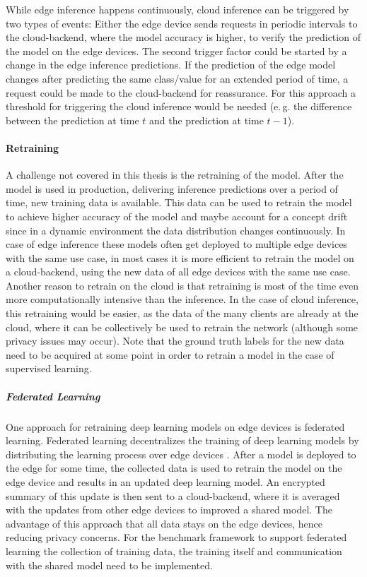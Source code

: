 While edge inference happens continuously, cloud inference can be triggered by two types of events:
Either the edge device sends requests in periodic intervals to the cloud-backend, where the model accuracy is higher, to verify the prediction of the model on the edge devices.
The second trigger factor could be started by a change in the edge inference predictions. If the prediction of the edge model changes after predicting the same class/value for an extended period of time, a request could be made to the cloud-backend for reassurance. For this approach a threshold for triggering the cloud inference would be needed (e.\,g. the difference between the prediction at time $t$ and the prediction at time $t-1$).



\paragraph{Retraining}
A challenge not covered in this thesis is the retraining of the model. After the model is used in production, delivering inference predictions over a period of time, new training data is available. This data can be used to retrain the model to achieve higher accuracy of the model and maybe account for a concept drift since in a dynamic environment the data distribution changes continuously.
In case of edge inference these models often get deployed to multiple edge devices with the same use case, in most cases it is more efficient to retrain the model on a cloud-backend, using the new data of all edge devices with the same use case. Another reason to retrain on the cloud is that retraining is most of the time even more computationally intensive than the inference.
In the case of cloud inference, this retraining would be easier, as the data of the many clients are already at the cloud, where it can be collectively be used to retrain the network (although some privacy issues may occur).
Note that the ground truth labels for the new data need to be acquired at some point in order to retrain a model in the case of supervised learning.

\subparagraph{Federated Learning}
One approach for retraining deep learning models on edge devices is federated learning.
Federated learning decentralizes the training of deep learning models by distributing the learning process over edge devices  \cite{federateLearning,DBLP:journals/corr/KonecnyMYRSB16}.
After a model is deployed to the edge for some time, the collected data is used to retrain the model on the edge device and results in an updated deep learning model. 
An encrypted summary of this update is then sent to a cloud-backend, where it is averaged with the updates from other edge devices to improved a shared model.
The advantage of this approach that all data stays on the edge devices, hence reducing privacy concerns.
For the benchmark framework to support federated learning the collection of training data, the training itself and communication with the shared model need to be implemented.
\endinput 
